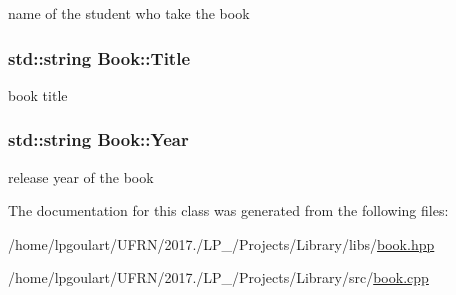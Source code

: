 name of the student who take the book 

\subsubsection[{\texorpdfstring{Title}{Title}}]{\setlength{\rightskip}{0pt plus 5cm}std\+::string Book\+::\+Title\hspace{0.3cm}{\ttfamily [private]}}\hypertarget{classBook_a862b94a2fd16ac90209afa4393d8df8a}{}\label{classBook_a862b94a2fd16ac90209afa4393d8df8a}


book title 

\subsubsection[{\texorpdfstring{Year}{Year}}]{\setlength{\rightskip}{0pt plus 5cm}std\+::string Book\+::\+Year\hspace{0.3cm}{\ttfamily [private]}}\hypertarget{classBook_ad3fc2c944e788d179c4d836f36662ae2}{}\label{classBook_ad3fc2c944e788d179c4d836f36662ae2}


release year of the book 



The documentation for this class was generated from the following files\+:\begin{DoxyCompactItemize}
\item 
/home/lpgoulart/\+U\+F\+R\+N/2017./\+L\+P\+\_/\+Projects/\+Library/libs/\hyperlink{book_8hpp}{book.\+hpp}\item 
/home/lpgoulart/\+U\+F\+R\+N/2017./\+L\+P\+\_/\+Projects/\+Library/src/\hyperlink{book_8cpp}{book.\+cpp}\end{DoxyCompactItemize}
